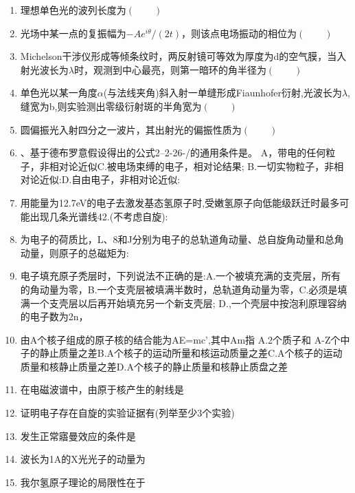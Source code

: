 \begin{enumerate}
(D)右旋椭圆偏振光
\item 理想单色光的波列长度为$(\qquad)$
\item 光场中某一点的复振幅为$-Ae^{i\theta}/ (2t)$，则该点电场振动的相位为$(\qquad)$
\item Michelson干涉仪形成等倾条纹时，两反射镜可等效为厚度为d的空气膜，当入射光波长为$\lambda$时，观测到中心最亮，则第一暗环的角半径为$(\qquad)$
\item 单色光以某一角度$\alpha$(与法线夹角)斜入射一单缝形成Fiaunhofer衍射,光波长为$\lambda$,缝宽为b,则实验测出零级衍射斑的半角宽为$(\qquad)$
\item 圆偏振光入射四分之一波片，其出射光的偏振性质为$(\qquad)$
\item 、基于德布罗意假设得出的公式2--2-26-/的通用条件是。
A，带电的任何粒子，非相对论近似C.被电场束缚的电子，相对论结果;
B.一切实物粒子，非相对论近似:D.自由电子，非相对论近似:
\item 用能量为12.7eV的电子去激发基态氢原子时,受嫩氢原子向低能级跃迁时最多可能出现几条光谱线42.(不考虑自旋):
\item 为电子的荷质比，L、8和J分别为电子的总轨道角动量、总自旋角动量和总角动量，则原子的总磁矩为:
\item 电子填充原子秃层时，下列说法不正确的是:A.一个被填充满的支壳层，所有的角动量为零，B.一个支壳层被填满半数时，总轨道角动量为零，C.必须是填满一个支壳层以后再开始填充另一个新支壳层;
D.,一个壳层中按泡利原理容纳的电子数为2n，
\item 由A个核子组成的原子核的结合能为AE=mc’,其中Am指
A.2个质子和 A-Z个中子的静止质量之差B.A个核子的运动所量和核运动质量之差C.A个核子的运动质量和核静止质量之差D.A个核子的静止质量和核静止质盘之差
\item 在电磁波谱中，由原于核产生的射线是
\item 证明电子存在自旋的实验证据有(列举至少3个实验)
\item 发生正常寤曼效应的条件是
\item 波长为1A的X光光子的动量为
\item 我尔氢原子理论的局限性在于
\end{enumerate}

